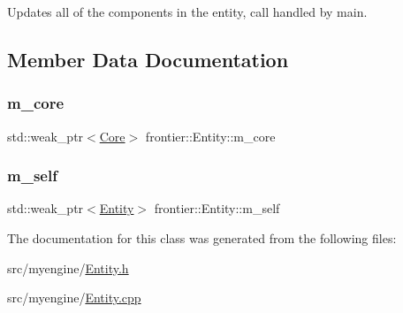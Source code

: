 Updates all of the components in the entity, call handled by main. 



\subsection{Member Data Documentation}
\mbox{\label{classfrontier_1_1_entity_a51d9396520afa49f35aa9459ce4f6134}} 
\subsubsection{\texorpdfstring{m\+\_\+core}{m\_core}}
{\footnotesize\ttfamily std\+::weak\+\_\+ptr$<$\hyperlink{classfrontier_1_1_core}{Core}$>$ frontier\+::\+Entity\+::m\+\_\+core\hspace{0.3cm}{\ttfamily [protected]}}

\mbox{\label{classfrontier_1_1_entity_acba38b7e5d44225066175d451de59c50}} 
\subsubsection{\texorpdfstring{m\+\_\+self}{m\_self}}
{\footnotesize\ttfamily std\+::weak\+\_\+ptr$<$\hyperlink{classfrontier_1_1_entity}{Entity}$>$ frontier\+::\+Entity\+::m\+\_\+self\hspace{0.3cm}{\ttfamily [protected]}}



The documentation for this class was generated from the following files\+:\begin{DoxyCompactItemize}
\item 
src/myengine/\hyperlink{_entity_8h}{Entity.\+h}\item 
src/myengine/\hyperlink{_entity_8cpp}{Entity.\+cpp}\end{DoxyCompactItemize}
